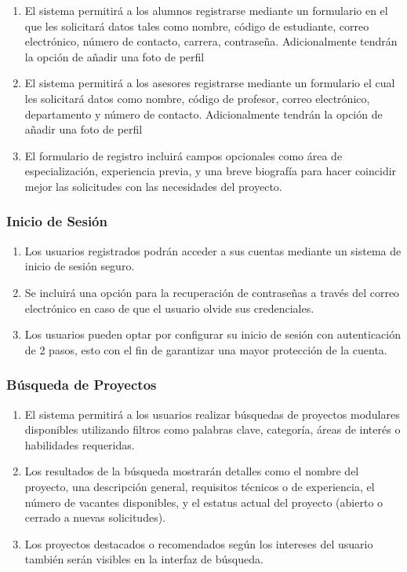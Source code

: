 	\begin{enumerate}
		\item El sistema permitirá a los alumnos registrarse mediante un formulario en
			el que les solicitará datos tales como nombre, código de estudiante, correo
			electrónico, número de contacto, carrera, contraseña. Adicionalmente tendrán
			la opción de añadir una foto de perfil

		\item El sistema permitirá a los asesores registrarse mediante un formulario
			el cual les solicitará datos como nombre, código de profesor, correo electrónico,
			departamento y número de contacto. Adicionalmente tendrán la opción de añadir
			una foto de perfil

		\item El formulario de registro incluirá campos opcionales como área de especialización,
			experiencia previa, y una breve biografía para hacer coincidir mejor las solicitudes
			con las necesidades del proyecto.
	\end{enumerate}

	\subsubsection{Inicio de Sesión}

	\begin{enumerate}
		\item Los usuarios registrados podrán acceder a sus cuentas mediante un sistema
			de inicio de sesión seguro.

		\item Se incluirá una opción para la recuperación de contraseñas a través del
			correo electrónico en caso de que el usuario olvide sus credenciales.

		\item Los usuarios pueden optar por configurar su inicio de sesión con autenticación
			de 2 pasos, esto con el fin de garantizar una mayor protección de la
			cuenta.
	\end{enumerate}

	\subsubsection{Búsqueda de Proyectos}

	\begin{enumerate}
		\item El sistema permitirá a los usuarios realizar búsquedas de proyectos modulares
			disponibles utilizando filtros como palabras clave, categoría, áreas de interés
			o habilidades requeridas.

		\item Los resultados de la búsqueda mostrarán detalles como el nombre del proyecto,
			una descripción general, requisitos técnicos o de experiencia, el número
			de vacantes disponibles, y el estatus actual del proyecto (abierto o
			cerrado a nuevas solicitudes).

		\item Los proyectos destacados o recomendados según los intereses del usuario
			también serán visibles en la interfaz de búsqueda.
	\end{enumerate}

